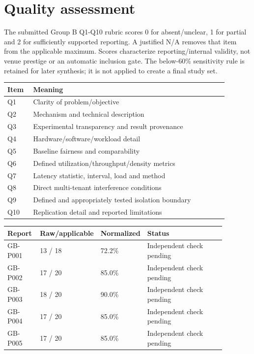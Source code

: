 \documentclass[12pt,a4paper]{article}
\begin{document}
\section{Quality assessment}

The submitted Group B Q1-Q10 rubric scores 0 for absent/\allowbreak{}unclear, 1 for partial and 2 for sufficiently supported reporting. A justified N/\allowbreak{}A removes that item from the applicable maximum. Scores characterize reporting/\allowbreak{}internal validity, not venue prestige or an automatic inclusion gate. The below-60\% sensitivity rule is retained for later synthesis; it is not applied to create a final study set.


\begin{longtable}{p{0.1\linewidth}p{0.79\linewidth}}
\toprule
Item & Meaning\\\midrule
\endhead
Q1 & Clarity of problem/\allowbreak{}objective\\
Q2 & Mechanism and technical description\\
Q3 & Experimental transparency and result provenance\\
Q4 & Hardware/\allowbreak{}software/\allowbreak{}workload detail\\
Q5 & Baseline fairness and comparability\\
Q6 & Defined utilization/\allowbreak{}throughput/\allowbreak{}density metrics\\
Q7 & Latency statistic, interval, load and method\\
Q8 & Direct multi-tenant interference conditions\\
Q9 & Defined and appropriately tested isolation boundary\\
Q10 & Replication detail and reported limitations\\
\bottomrule
\end{longtable}

\begin{longtable}{p{0.15\linewidth}p{0.19\linewidth}p{0.16\linewidth}p{0.38\linewidth}}
\toprule
Report & Raw/\allowbreak{}applicable & Normalized & Status\\\midrule
\endhead
GB-P001 & 13 /\allowbreak{} 18 & 72.2\% & Independent check pending\\
GB-P002 & 17 /\allowbreak{} 20 & 85.0\% & Independent check pending\\
GB-P003 & 18 /\allowbreak{} 20 & 90.0\% & Independent check pending\\
GB-P004 & 17 /\allowbreak{} 20 & 85.0\% & Independent check pending\\
GB-P005 & 17 /\allowbreak{} 20 & 85.0\% & Independent check pending\\
\bottomrule
\end{longtable}
\end{document}
